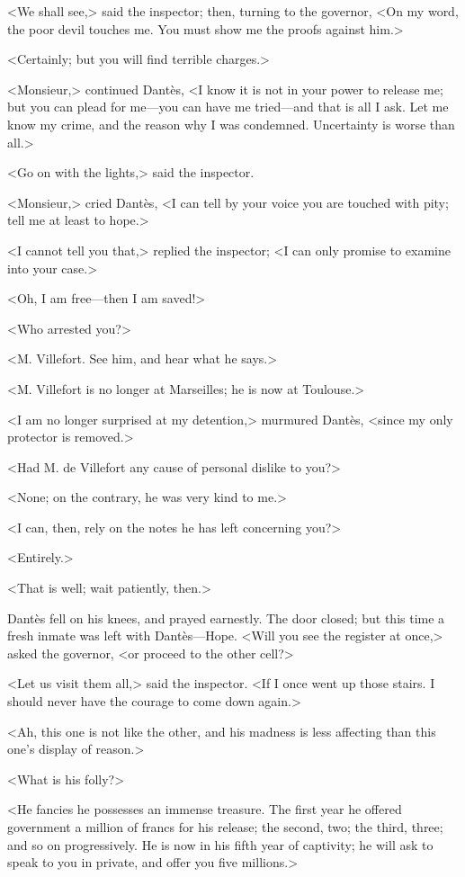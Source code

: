 <We shall see,> said the inspector; then, turning to the governor, <On my word, the poor devil touches me. You must show me the proofs against him.> 

 <Certainly; but you will find terrible charges.> 

 <Monsieur,> continued Dantès, <I know it is not in your power to release me; but you can plead for me—you can have me tried—and that is all I ask. Let me know my crime, and the reason why I was condemned. Uncertainty is worse than all.> 

 <Go on with the lights,> said the inspector. 

 <Monsieur,> cried Dantès, <I can tell by your voice you are touched with pity; tell me at least to hope.> 

 <I cannot tell you that,> replied the inspector; <I can only promise to examine into your case.> 

 <Oh, I am free—then I am saved!> 

 <Who arrested you?> 

 <M. Villefort. See him, and hear what he says.> 

 <M. Villefort is no longer at Marseilles; he is now at Toulouse.> 

 <I am no longer surprised at my detention,> murmured Dantès, <since my only protector is removed.> 

 <Had M. de Villefort any cause of personal dislike to you?> 

 <None; on the contrary, he was very kind to me.> 

 <I can, then, rely on the notes he has left concerning you?> 

 <Entirely.> 

 <That is well; wait patiently, then.> 

 Dantès fell on his knees, and prayed earnestly. The door closed; but this time a fresh inmate was left with Dantès—Hope.  <Will you see the register at once,> asked the governor, <or proceed to the other cell?> 

 <Let us visit them all,> said the inspector. <If I once went up those stairs. I should never have the courage to come down again.> 

 <Ah, this one is not like the other, and his madness is less affecting than this one's display of reason.> 

 <What is his folly?> 

 <He fancies he possesses an immense treasure. The first year he offered government a million of francs for his release; the second, two; the third, three; and so on progressively. He is now in his fifth year of captivity; he will ask to speak to you in private, and offer you five millions.> 

